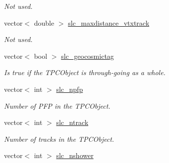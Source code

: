 \begin{DoxyCompactItemize}
\begin{DoxyCompactList}\small\item\em Not used. \end{DoxyCompactList}\item 
\hypertarget{classUBXSecEvent_afbcefec1936192c7a46b3414d7f3067d}{vector$<$ double $>$ \hyperlink{classUBXSecEvent_afbcefec1936192c7a46b3414d7f3067d}{slc\-\_\-maxdistance\-\_\-vtxtrack}}\label{classUBXSecEvent_afbcefec1936192c7a46b3414d7f3067d}

\begin{DoxyCompactList}\small\item\em Not used. \end{DoxyCompactList}\item 
\hypertarget{classUBXSecEvent_a5bf2adbb96dee74effb2efb02ca73ca6}{vector$<$ bool $>$ \hyperlink{classUBXSecEvent_a5bf2adbb96dee74effb2efb02ca73ca6}{slc\-\_\-geocosmictag}}\label{classUBXSecEvent_a5bf2adbb96dee74effb2efb02ca73ca6}

\begin{DoxyCompactList}\small\item\em Is true if the T\-P\-C\-Object is through-\/going as a whole. \end{DoxyCompactList}\item 
\hypertarget{classUBXSecEvent_a9e7b76e3075ee41f14cb93f895a28281}{vector$<$ int $>$ \hyperlink{classUBXSecEvent_a9e7b76e3075ee41f14cb93f895a28281}{slc\-\_\-npfp}}\label{classUBXSecEvent_a9e7b76e3075ee41f14cb93f895a28281}

\begin{DoxyCompactList}\small\item\em Number of P\-F\-P in the T\-P\-C\-Object. \end{DoxyCompactList}\item 
\hypertarget{classUBXSecEvent_a536003dadab39e399dcfc6aebea8cd17}{vector$<$ int $>$ \hyperlink{classUBXSecEvent_a536003dadab39e399dcfc6aebea8cd17}{slc\-\_\-ntrack}}\label{classUBXSecEvent_a536003dadab39e399dcfc6aebea8cd17}

\begin{DoxyCompactList}\small\item\em Number of tracks in the T\-P\-C\-Object. \end{DoxyCompactList}\item 
\hypertarget{classUBXSecEvent_a9ae1d6293a6f915b13979f2e88513966}{vector$<$ int $>$ \hyperlink{classUBXSecEvent_a9ae1d6293a6f915b13979f2e88513966}{slc\-\_\-nshower}}\label{classUBXSecEvent_a9ae1d6293a6f915b13979f2e88513966}


\end{DoxyCompactItemize}
